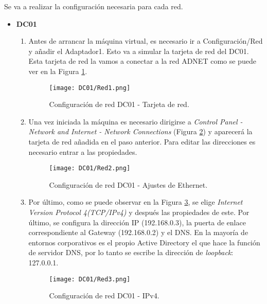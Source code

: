 Se va a realizar la configuración necesaria para cada red. 

\begin{itemize}
\item \textbf{DC01}
\begin{enumerate}
\item Antes de arrancar la máquina virtual, es necesario ir a Configuración/Red y añadir el Adaptador1. Esto va a simular la tarjeta de red del DC01. Esta tarjeta de red la vamos a conectar a la red ADNET como se puede ver en la Figura \ref{DC01-Red1}.

\begin{figure}[H] %
\begin{center}
\texttt{[image: DC01/Red1.png]}
\end{center}
\caption{Configuración de red DC01 - Tarjeta de red.}
\label{DC01-Red1}
\end{figure}

\item Una vez iniciada la máquina es necesario dirigirse a {\it Control Panel - Network and Internet - Network Connections} (Figura \ref{DC01-Red2}) y aparecerá la tarjeta de red añadida en el paso anterior. Para editar las direcciones es necesario entrar a las propiedades.
\begin{figure}[H] %
\begin{center}
\texttt{[image: DC01/Red2.png]}
\end{center}
\caption{Configuración de red DC01 - Ajustes de Ethernet.}
\label{DC01-Red2}
\end{figure}

\item Por último, como se puede observar en la Figura \ref{DC01-Red3}, se elige {\it Internet Version Protocol 4(TCP/IPv4) } y después las propiedades de este. Por último, se configura la dirección IP (192.168.0.3), la puerta de enlace correspondiente al Gateway (192.168.0.2) y el DNS. En la mayoría de entornos corporativos es el propio Active Directory el que hace la función de servidor DNS, por lo tanto se escribe la dirección de {\it loopback}: 127.0.0.1.
\begin{figure}[H] %
\begin{center}
\texttt{[image: DC01/Red3.png]}
\end{center}
\caption{Configuración de red DC01 - IPv4.}
\label{DC01-Red3}
\end{figure}
\end{enumerate}


\end{itemize}
